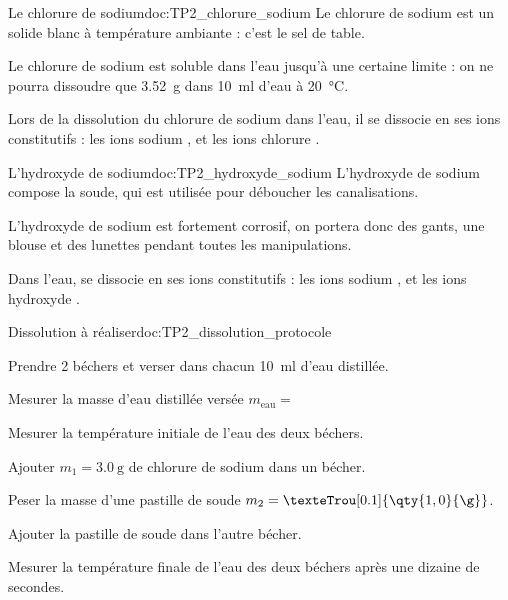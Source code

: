 \begin{multicols}{2}
  \begin{doc}{Le chlorure de sodium}{doc:TP2_chlorure_sodium}
    Le chlorure de sodium  est un solide blanc à température ambiante : c'est le sel de table.
    \vspace*{4pt}
    
    Le chlorure de sodium est soluble dans l'eau jusqu'à une certaine limite : on ne pourra dissoudre que \qty{3,52}{\g} dans \qty{10}{\ml} d'eau à \qty{20}{\degreeCelsius}.
    \vspace*{5pt}
  
    Lors de la dissolution du chlorure de sodium dans l'eau, il se dissocie en ses ions constitutifs : les ions sodium \ionSodium, et les ions chlorure \chlorure.
  \end{doc}
  
  \begin{doc}{L'hydroxyde de sodium}{doc:TP2_hydroxyde_sodium}
    L'hydroxyde de sodium  compose la soude, qui est utilisée pour déboucher les canalisations.
    \vspace*{-4pt}

    \begin{importants}  
      \attention L'hydroxyde de sodium est fortement corrosif, on portera donc des gants, une blouse et des lunettes pendant toutes les manipulations.
    \end{importants}
    \vspace*{-4pt}
  
    Dans l'eau,  se dissocie en ses ions constitutifs : les ions sodium \ionSodium, et les ions hydroxyde .
  \end{doc}
\end{multicols}

\begin{doc}{Dissolution à réaliser}{doc:TP2_dissolution_protocole}
  \begin{protocole}
      
    \item Prendre 2 béchers et verser dans chacun \qty{10}{\ml} d’eau distillée.
    \item Mesurer la masse d'eau distillée versée $m_\text{eau} =$ 
    \item Mesurer la température initiale de l'eau des deux béchers.
    \item Ajouter $m_1 = \qty{3,0}{\g}$ de chlorure de sodium dans un bécher.
    \item Peser la masse d'une pastille de soude $m_2 = \texteTrou[0.1]{\qty{1,0}{\g}}$.
    \item Ajouter la pastille de soude dans l'autre bécher.
    \item Mesurer la température finale de l'eau des deux béchers après une dizaine de secondes.
  \end{protocole}
\end{doc}


